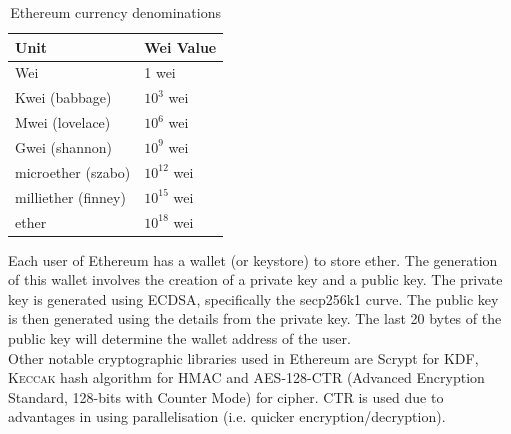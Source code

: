 \documentclass[a4paper,12pt]{article}
\begin{document}
{{\begin{table}[H]
		\begin{tabular}{|l|l|}
			\hline
			\rowcolor[HTML]{C0C0C0} 
			Unit                & Wei Value   \\ \hline
			Wei                 & 1 wei       \\ \hline
			Kwei (babbage)      & $10^3$ wei  \\ \hline
			Mwei (lovelace)     & $10^6$ wei  \\ \hline
			Gwei (shannon)      & $10^9$ wei  \\ \hline
			microether (szabo)  & $10^{12}$ wei \\ \hline
			milliether (finney) & $10^{15}$ wei \\ \hline
			ether               & $10^{18}$ wei \\ \hline
		\end{tabular}
			\caption[Ethereum currency denominations]{Ethereum currency denominations \cite{ethcur}}
	\label{ethcur}
	\end{table}
\noindent Each user of Ethereum has a wallet (or keystore) to store ether. The generation of this wallet involves the creation of a private key and a public key. The private key is generated using \ac{ECDSA}, specifically the secp256k1 curve. The public key is then generated using the details from the private key. The last 20 bytes of the public key will determine the wallet address of the user.\\\newline
Other notable cryptographic libraries used in Ethereum are Scrypt for \ac{KDF}, \textsc{Keccak} hash algorithm for \ac{HMAC} and AES-128-CTR (Advanced Encryption Standard, 128-bits with Counter Mode) for cipher. CTR is used due to advantages in using parallelisation (i.e. quicker encryption/decryption).
	}
}
\end{document}
